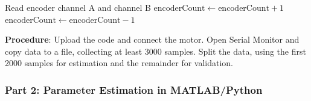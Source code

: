 \begin{algorithm}
\caption{Encoder Update (Interrupt Service Routine)}
\label{alg:encoder_update}
\begin{algorithmic}[1]
\State Read encoder channel A and channel B
    \State $\text{encoderCount} \gets \text{encoderCount} + 1$
\Else
    \State $\text{encoderCount} \gets \text{encoderCount} - 1$
\EndIf
\end{algorithmic}
\end{algorithm}

\textbf{Procedure}: Upload the code and connect the motor. Open Serial Monitor and copy data to a file, collecting at least 3000 samples. Split the data, using the first 2000 samples for estimation and the remainder for validation.

\subsubsection{Part 2: Parameter Estimation in MATLAB/Python}

